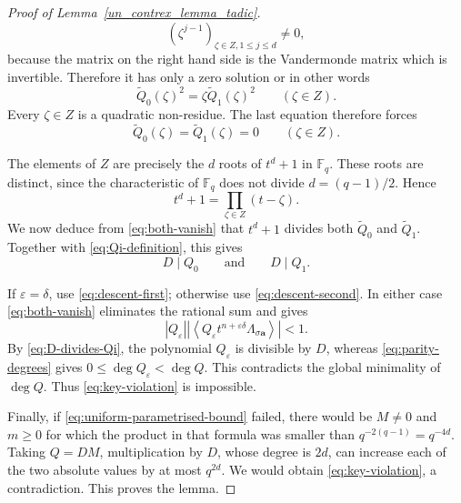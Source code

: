 \documentclass[11pt]{article}
\theoremstyle{remark}
\begin{document}
\begin{proof}[Proof of Lemma~\ref{un_contrex_lemma_tadic}]
$$(\zeta^{j-1})_{\zeta\in Z, 1\le j\le d }\neq 0,
$$
because the matrix on the right hand side is the Vandermonde matrix
which is invertible. Therefore it has only a zero solution or in
other words
$$
 \widetilde Q_0(\zeta)^2
 =\zeta\widetilde Q_1(\zeta)^2
 \qquad(\zeta\in Z).
$$
Every $\zeta\in Z$ is a quadratic non-residue. The last equation
therefore forces
\begin{equation} \label{eq:both-vanish}
 \widetilde Q_0(\zeta)=\widetilde Q_1(\zeta)=0
 \qquad(\zeta\in Z).
\end{equation}

The elements of $Z$ are precisely the $d$ roots of $t^d+1$ in
$\mathbb F_q$.  These roots are distinct, since the characteristic of
$\mathbb F_q$ does not divide $d=(q-1)/2$.  Hence
\[
 t^d+1=\prod_{\zeta\in Z}(t-\zeta).
\]
We now deduce from \eqref{eq:both-vanish} that $t^d+1$ divides both
$\widetilde Q_0$ and $\widetilde Q_1$.  Together with
\eqref{eq:Qi-definition}, this gives
\begin{equation} \label{eq:D-divides-Qi}
 D\mid Q_0
 \qquad\text{and}\qquad
 D\mid Q_1.
\end{equation}

If $\varepsilon=\delta$, use \eqref{eq:descent-first}; otherwise use
\eqref{eq:descent-second}.  In either case \eqref{eq:both-vanish}
eliminates the rational sum and gives
\begin{equation} \label{eq:smaller-violation}
 \left|Q_\varepsilon\right|
 \left|\left\langle
 Q_\varepsilon t^{n+\varepsilon\delta}
 \Lambda_{\sigma\mathbf a}\right\rangle\right|<1.
\end{equation}
By \eqref{eq:D-divides-Qi}, the polynomial $Q_\varepsilon$ is
divisible by $D$, whereas \eqref{eq:parity-degrees} gives $0\leq\deg
Q_\varepsilon<\deg Q$.  This contradicts the global minimality of
$\deg Q$.  Thus \eqref{eq:key-violation} is impossible.

Finally, if \eqref{eq:uniform-parametrised-bound} failed, there
would be $M\ne0$ and $m\geq0$ for which the product in that formula
was smaller than $q^{-2(q-1)}=q^{-4d}$.  Taking $Q=DM$,
multiplication by $D$, whose degree is $2d$, can increase each of
the two absolute values by at most $q^{2d}$. We would obtain
\eqref{eq:key-violation}, a contradiction.  This proves the lemma.
\end{proof}
\end{document}
